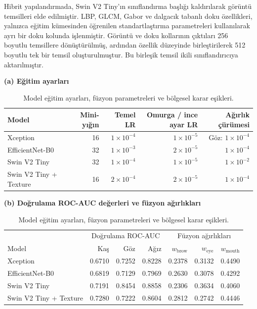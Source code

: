 \documentclass[a4paper]{elektr}
\begin{document}
Hibrit yapılandırmada, Swin V2 Tiny’ın sınıflandırma başlığı kaldırılarak görüntü temsilleri elde edilmiştir. LBP, GLCM, Gabor ve dalgacık tabanlı doku özellikleri, yalnızca eğitim kümesinden öğrenilen standartlaştırma parametreleri kullanılarak ayrı bir doku kolunda işlenmiştir. Görüntü ve doku kollarının çıktıları 256 boyutlu temsillere dönüştürülmüş, ardından özellik düzeyinde birleştirilerek 512 boyutlu tek bir temsil oluşturulmuştur. Bu birleşik temsil ikili sınıflandırıcıya aktarılmıştır.
\begin{table}[!htbp]\centering\begin{minipage}{15.8cm}
\caption{Model eğitim ayarları, füzyon parametreleri ve bölgesel karar eşikleri.}\label{tab:settings}
\centering\small
\textbf{(a) Eğitim ayarları}\par\smallskip
\begin{tabular*}{\linewidth}{@{\extracolsep{\fill}}lrrrr@{}}\toprule
Model & Mini-yığın & Temel LR & Omurga / ince ayar LR & Ağırlık çürümesi\\\midrule
Xception & 16 & $1\times10^{-4}$ & $1\times10^{-5}$ & Göz: $1\times10^{-4}$\\
EfficientNet-B0 &32&$1\times10^{-3}$&$2\times10^{-5}$&$1\times10^{-4}$\\
Swin V2 Tiny &32&$1\times10^{-4}$&$1\times10^{-5}$&$1\times10^{-2}$\\
Swin V2 Tiny + Texture &16&$2\times10^{-4}$&$2\times10^{-5}$&$1\times10^{-4}$\\\bottomrule
\end{tabular*}
\par\medskip
\textbf{(b) Doğrulama ROC-AUC değerleri ve füzyon ağırlıkları}\par\smallskip
\begin{tabular*}{\linewidth}{@{\extracolsep{\fill}}lrrrrrr@{}}\toprule
&\multicolumn{3}{c}{Doğrulama ROC-AUC}&\multicolumn{3}{c}{Füzyon ağırlıkları}\\
Model & Kaş & Göz & Ağız & $w_{\mathrm{brow}}$ & $w_{\mathrm{eye}}$ & $w_{\mathrm{mouth}}$\\\midrule
Xception&0.6710&0.7252&0.8228&0.2378&0.3132&0.4490\\
EfficientNet-B0&0.6819&0.7129&0.7969&0.2630&0.3078&0.4292\\
Swin V2 Tiny&0.7191&0.8454&0.8858&0.2306&0.3634&0.4060\\
Swin V2 Tiny + Texture&0.7280&0.7222&0.8604&0.2812&0.2742&0.4446\\\bottomrule
\end{tabular*}

\end{minipage}
\end{table}
\end{document}

